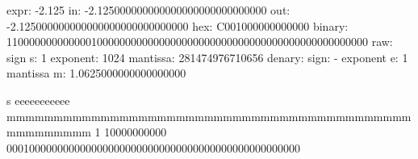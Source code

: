     expr:   -2.125
    in:     -2.125000000000000000000000000000
    out:    -2.125000000000000000000000000000
    hex:    C001000000000000
    binary: 1100000000000001000000000000000000000000000000000000000000000000
    raw:    sign s: 1  exponent:   1024  mantissa:         281474976710656
    denary: sign:   -  exponent e:    1  mantissa m: 1.0625000000000000000

    s eeeeeeeeeee mmmmmmmmmmmmmmmmmmmmmmmmmmmmmmmmmmmmmmmmmmmmmmmmmmmm
    1 10000000000 0001000000000000000000000000000000000000000000000000
